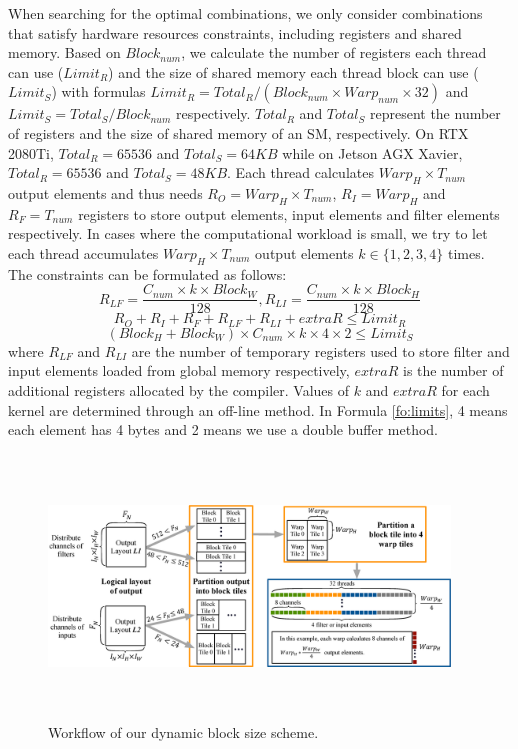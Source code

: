 When searching for the optimal combinations, we only consider combinations that satisfy hardware resources constraints, including registers and shared memory.
Based on $Block_{num}$, we calculate the number of registers each thread can use ($Limit_R$) and the size of shared memory each thread block can use ($Limit_S$) with formulas $Limit_R=Total_R/(Block_{num}\times Warp_{num} \times 32)$ and $Limit_S=Total_S/Block_{num}$ respectively. $Total_R$ and $Total_S$ represent the number of registers and the size of shared memory of an SM, respectively. On RTX 2080Ti, $Total_R=65536$ and $Total_S=64KB$ while  on Jetson AGX Xavier, $Total_R=65536$ and $Total_S=48KB$.
Each thread calculates $Warp_H \times T_{num}$ output elements and thus needs $R_O=Warp_H \times T_{num}$, $R_I=Warp_H$ and $R_F=T_{num}$ registers to store output elements, input elements and filter elements respectively.
In cases where the computational workload is small, we try to let each thread accumulates $Warp_H \times T_{num}$ output elements $k \in \{1,2,3,4\}$ times.
The constraints can be formulated as follows:
\begin{equation}\nonumber
R_{LF}=\frac{C_{num} \times k \times Block_W}{128},R_{LI}=\frac{C_{num} \times k \times Block_H}{128}
\end{equation}
\begin{equation}
    \label{fo:limitr}
R_O+R_I+R_F+R_{LF}+R_{LI}+extraR \leq Limit_R
\end{equation}
\begin{equation}
    \label{fo:limits}
(Block_H+Block_W)\times C_{num} \times k \times 4 \times 2 \leq Limit_S
\end{equation}
where $R_{LF}$ and $R_{LI}$ are the number of temporary registers used to store filter and input elements loaded from global memory respectively, $extraR$ is the number of additional registers allocated by the compiler. Values of $k$ and $extraR$ for each kernel are determined through an off-line method. In Formula \ref{fo:limits}, 4 means each element has 4 bytes and 2 means we use a double buffer method.
\begin{figure}
	\centering
    \includegraphics[width=0.95\textwidth,height=7cm]{./figure/pwworkflow.eps}
    \caption{Workflow of our dynamic block size scheme.} \label{fig:pwworkflow}
\end{figure}
